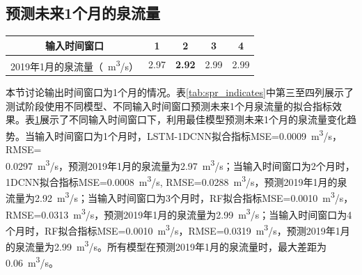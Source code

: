 {\begin{longtable}{clcccccccc}
  \end{longtable}
}

\subsection{预测未来1个月的泉流量}\label{sec:spr_one}

\begin{table}[!htbp]
  \centering
  \label{tab:spr_one}
  \footnotesize
  \begin{tabular}{ccccc}
    \toprule
    输入时间窗口 & 1 & 2 & 3 & 4\\
    \midrule
    2019年1月的泉流量（\SI{}{m^{3}/s}）& 2.97 & \textbf{2.92} & 2.99 & 2.99 \\
    \bottomrule
  \end{tabular}
\end{table}

本节讨论输出时间窗口为1个月的情况。表\ref{tab:spr_indicates}中第三至四列展示了测试阶段使用不同模型、不同输入时间窗口预测未来1个月泉流量的拟合指标效果。表\ref{tab:spr_one}展示了不同输入时间窗口下，利用最佳模型预测未来1个月的泉流量变化趋势。当输入时间窗口为1个月时，LSTM-1DCNN拟合指标MSE=\SI{0.0009}{m^{3}/s}，RMSE=\\\SI{0.0297}{m^{3}/s}，预测2019年1月的泉流量为\SI{2.97}{m^{3}/s}；当输入时间窗口为2个月时，1DCNN拟合指标MSE=\SI{0.0008}{m^{3}/s}, RMSE=\SI{0.0288}{m^{3}/s}，预测2019年1月的泉流量为\SI{2.92}{m^{3}/s}；当输入时间窗口为3个月时，RF拟合指标MSE=\SI{0.0010}{m^{3}/s}，RMSE=\SI{0.0313}{m^{3}/s}，预测2019年1月的泉流量为\SI{2.99}{m^{3}/s}；当输入时间窗口为4个月时，RF拟合指标MSE=\SI{0.0010}{m^{3}/s}，RMSE=\SI{0.0319}{m^{3}/s}，预测2019年1月的泉流量为\SI{2.99}{m^{3}/s}。所有模型在预测2019年1月的泉流量时，最大差距为\SI{0.06}{m^{3}/s}。

